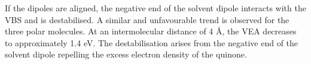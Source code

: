 If the dipoles are aligned, the negative end of the solvent dipole interacts with the VBS and is destabilised. A similar and unfavourable trend is observed for the three polar molecules. At an intermolecular distance of 4 \r{A}, the VEA decreases to approximately 1.4 eV. The destabilisation arises from the negative end of the solvent dipole repelling the excess electron density of the quinone.


\cleardoublepage

